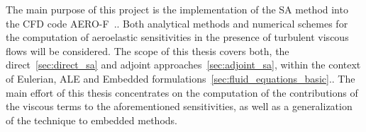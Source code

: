 The main purpose of this project is the implementation of the \ac{SA} method into the \ac{CFD} code AERO-F~\cite{Aerof}..
Both analytical methods and numerical schemes for the computation of
aeroelastic sensitivities in the presence of turbulent viscous flows will be considered.
The scope of this thesis covers both, the direct~\ref{sec:direct_sa} and adjoint approaches~\ref{sec:adjoint_sa}, within the context of Eulerian, \ac{ALE} and Embedded formulations~\ref{sec:fluid_equations_basic}..
The main effort of this thesis concentrates on the computation of the contributions of the viscous terms to the aforementioned sensitivities, as well as a generalization of the technique to embedded methods.